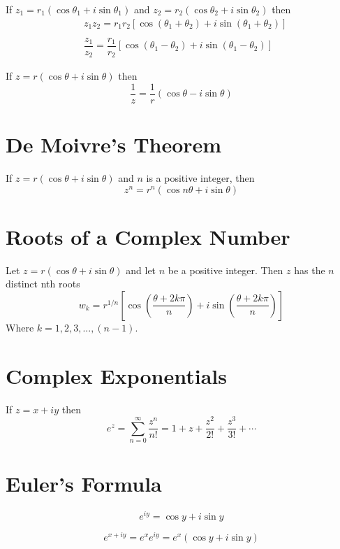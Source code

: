 If $z_1=r_1\left( \cos \theta_1 +i\sin \theta_1\right)$ and $z_2=r_2\left( \cos \theta_2 +i\sin \theta_2\right)$ then
$$\begin{aligned} 
&z_1z_2=r_1r_2\left[\cos\left( \theta_1+\theta_2 \right)+i\sin\left( \theta_1+\theta_2 \right) \right] \\ \\
&\dfrac{z_1}{z_2}=\dfrac{r_1}{r_2}\left[\cos\left(\theta_1-\theta_2\right)+i\sin \left(\theta_1-\theta_2 \right)\right]
\end{aligned}$$

If $z=r \left( \cos \theta + i\sin \theta \right)$ then
$$\dfrac{1}{z}=\dfrac{1}{r}\left( \cos \theta - i\sin \theta\right)$$

\section{De Moivre's Theorem}

If $z=r\left( \cos \theta + i\sin \theta \right)$ and $n$ is a positive integer, then 
$$z^n=r^n\left( \cos n\theta + i\sin \theta \right)$$

\section{Roots of a Complex Number}

Let $z=r\left( \cos \theta + i\sin \theta \right)$ and let $n$ be a positive integer. Then $z$ has the $n$ distinct nth roots
$$w_k=r^{1/n}\left[ \cos \left( \dfrac{\theta + 2k\pi}{n} \right) + i\sin \left( \dfrac{\theta + 2k\pi}{n} \right) \right]$$
Where $k=1,2,3,..., (n-1)$.

\section{Complex Exponentials}

If $z=x + iy$ then
$$e^z=\sum_{n=0}^{\infty} \dfrac{z^n}{n!}=1+z+\dfrac{z^2}{2!}+\dfrac{z^3}{3!}+\cdots $$

\section{Euler's Formula}

$$e^{iy}=\cos y + i\sin y$$

$$e^{x + iy}=e^xe^{iy}=e^x \left( \cos y + i\sin y \right)$$



